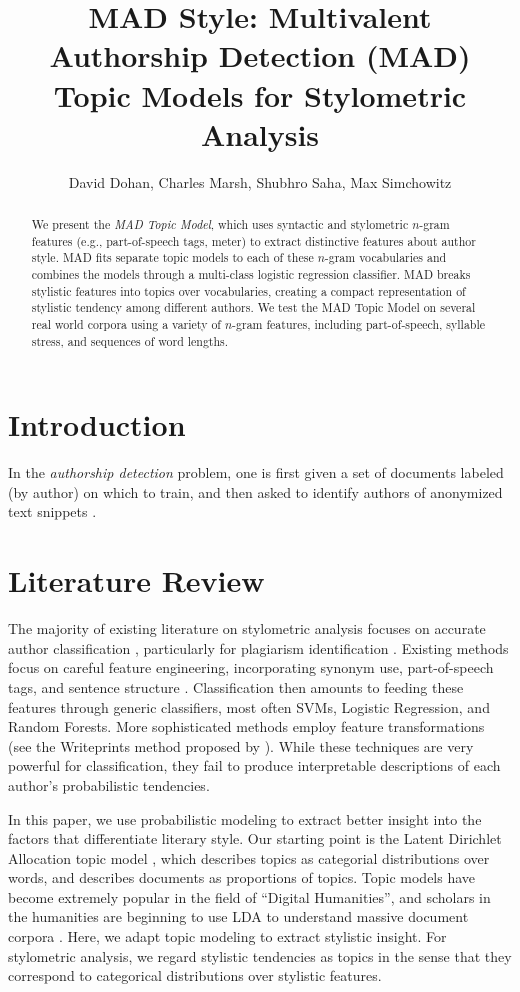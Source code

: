 \documentclass[14pt]{article} %
\title{MAD Style: Multivalent Authorship Detection (MAD) Topic Models for Stylometric Analysis}
\author{David Dohan, Charles Marsh, Shubhro Saha, Max Simchowitz}
\theoremstyle{plain}
\theoremstyle{definition}
\theoremstyle{remark}
\begin{document}
\maketitle
\large
\begin{abstract}
We present the \textit{MAD Topic Model}, which uses  syntactic and stylometric $n$-gram features (e.g., part-of-speech tags, meter) to extract distinctive features about author style. MAD fits separate topic models to each of these $n$-gram vocabularies and combines the models through a multi-class logistic regression classifier. MAD breaks stylistic features into topics over vocabularies, creating a compact representation of stylistic tendency among different authors. We test the MAD Topic Model on several real world corpora using a variety of $n$-gram features, including part-of-speech, syllable stress, and sequences of word lengths.
\end{abstract}

\section{Introduction}

In the \textit{authorship detection} problem, one is first given a set of documents labeled (by author) on which to train, and then asked to identify authors of anonymized text snippets \citep{Stein}.

\section{Literature Review}

The majority of existing literature on stylometric analysis focuses on accurate author classification \cite{stamatatos2009survey}, particularly for plagiarism identification \cite{stamatatos2009intrinsic} \cite{Stein}. Existing methods focus on careful feature engineering, incorporating synonym use, part-of-speech tags, and sentence structure \cite{stamatatos2009survey}. Classification then amounts to feeding these features through generic classifiers, most often SVMs, Logistic Regression, and Random Forests. More sophisticated methods employ feature transformations (see the Writeprints method proposed by \citet{abbasi2008writeprints}). While these techniques are very powerful for classification, they fail to produce interpretable descriptions of each author's probabilistic tendencies.

	In this paper, we use probabilistic modeling to extract better insight into the factors that differentiate literary style. Our starting point is the Latent Dirichlet Allocation topic model \cite{Blei2003}, which describes topics as categorial distributions over words, and describes documents as proportions of topics. Topic models have become extremely popular in the field of ``Digital Humanities'', and scholars in the humanities are beginning to use LDA to understand massive document corpora \cite{blei2012topic}. Here, we adapt topic modeling to extract stylistic insight. For stylometric analysis, we regard stylistic tendencies as topics in the sense that they correspond to categorical distributions over stylistic features.
\end{document}
